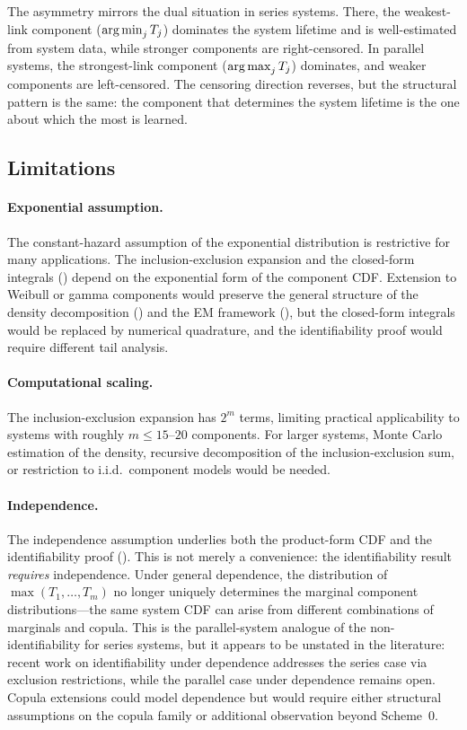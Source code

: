 The asymmetry mirrors the dual situation in series systems.  There,
the weakest-link component ($\operatorname*{arg\,min}_j T_j$) dominates the system
lifetime and is well-estimated from system data, while stronger
components are right-censored.  In parallel systems, the
strongest-link component ($\operatorname*{arg\,max}_j T_j$) dominates, and weaker
components are left-censored.  The censoring direction reverses, but
the structural pattern is the same: the component that determines the
system lifetime is the one about which the most is learned.

\subsection{Limitations}

\paragraph{Exponential assumption.}
The constant-hazard assumption of the exponential distribution is
restrictive for many applications.  The inclusion-exclusion expansion
and the closed-form integrals () depend
on the exponential form of the component CDF.  Extension to Weibull
or gamma components would preserve the general structure of the
density decomposition () and the EM
framework (), but the closed-form integrals
would be replaced by numerical quadrature, and the identifiability
proof would require different tail analysis.

\paragraph{Computational scaling.}
The inclusion-exclusion expansion has $2^m$ terms, limiting practical
applicability to systems with roughly $m \leq 15$--$20$ components.
For larger systems, Monte Carlo estimation of the density, recursive
decomposition of the inclusion-exclusion sum, or restriction to i.i.d.\
component models would be needed.

\paragraph{Independence.}
The independence assumption underlies both the product-form CDF and the
identifiability proof (\Cref{thm:identifiability}).  This is not merely
a convenience: the \citet{BasuGhosh1980} identifiability result
\emph{requires} independence.  Under general dependence, the
distribution of $\max(T_1, \ldots, T_m)$ no longer uniquely determines
the marginal component distributions---the same system CDF can arise
from different combinations of marginals and copula.  This is the
parallel-system analogue of the \citet{Tsiatis1975} non-identifiability
for series systems, but it appears to be unstated in the literature:
recent work on identifiability under dependence
\citep{HiabuLoWilke2025} addresses the series case via exclusion
restrictions, while the parallel case under dependence remains open.
Copula extensions \citep{NavarroNgBalakrishnan2012} could model
dependence but would require either structural assumptions on the
copula family or additional observation beyond Scheme~0.

